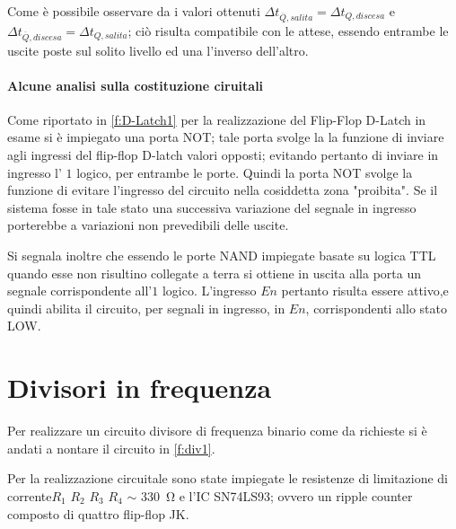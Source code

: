 	Come è possibile osservare da i valori ottenuti $\Delta t_{\overline{Q},salita} = \Delta t_{{Q},discesa}$ e $\Delta t_{\overline{Q},discesa} = \Delta t_{{Q},salita}$; ciò risulta compatibile con le attese, essendo entrambe le uscite poste sul solito livello ed una l'inverso dell'altro.
	\paragraph{Alcune analisi sulla costituzione ciruitali }
	Come riportato in \figurename{ \ref{f:D-Latch1}} per la realizzazione del Flip-Flop D-Latch in esame si è impiegato una porta NOT;
	tale porta svolge la la funzione di inviare agli ingressi del flip-flop D-latch valori opposti; evitando pertanto di inviare in ingresso l' $1$ logico, per entrambe le porte.
	Quindi la porta NOT svolge la funzione di evitare l'ingresso del circuito nella cosiddetta zona "proibita".
	Se il sistema fosse in tale stato una successiva variazione del segnale in ingresso porterebbe a variazioni non prevedibili delle uscite.
	
	Si segnala inoltre che essendo le porte NAND impiegate basate su logica TTL quando esse non risultino collegate a terra si ottiene in uscita alla porta un segnale corrispondente all'$1$ logico.
	L'ingresso $En$ pertanto risulta essere attivo,e quindi abilita il circuito, per
	segnali in ingresso, in $En$, corrispondenti allo stato LOW.
	
	\section{Divisori in frequenza}
	Per realizzare un circuito divisore di frequenza binario come da richieste si è andati a nontare il circuito in \figurename{ \ref{f:div1}}.
	
	Per la realizzazione circuitale sono state impiegate le resistenze di limitazione di corrente$R_{1}$ $R_{2}$ $R_{3}$	$R_{4}$ $\sim$ \SI{330}{\ohm}
	e l'IC SN74LS93; ovvero un ripple counter composto di quattro flip-flop JK.
	
